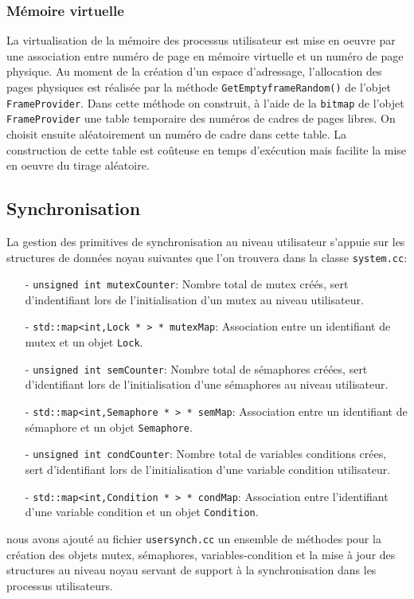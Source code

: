 \documentclass[11pt]{article}
\theoremstyle{definition}
\theoremstyle{definition}
\begin{document}
\subsubsection{Mémoire virtuelle}
La virtualisation de la mémoire des processus utilisateur est mise en oeuvre par une association entre numéro
de page en mémoire virtuelle et un numéro de page physique. Au moment de la création d'un espace d'adressage, l'allocation des pages physiques est réalisée par la méthode \texttt{GetEmptyframeRandom()} de l'objet \texttt{FrameProvider}.
Dans cette méthode on construit, à l'aide de la \texttt{bitmap} de l'objet \texttt{FrameProvider} une table temporaire des numéros de cadres de pages libres.
On choisit ensuite aléatoirement un numéro de cadre dans cette table. La construction de cette table est coûteuse en temps d'exécution mais facilite la mise en oeuvre du tirage aléatoire.

\subsection{Synchronisation}
La gestion des primitives de synchronisation au niveau utilisateur s'appuie sur les structures de données noyau suivantes que l'on trouvera dans la classe \texttt{system.cc}:
\begin{itemize}
\item[-]\texttt{unsigned int mutexCounter}: Nombre total de mutex créés,
  sert d'indentifiant lors de l'initialisation d'un mutex au niveau utilisateur.
\item[-]\texttt{std::map<int,Lock * > * mutexMap}: Association entre un identifiant de mutex
  et un objet \texttt{Lock}.
\item[-]\texttt{unsigned int semCounter}: Nombre total de sémaphores créées,
  sert d'identifiant lors de l'initialisation d'une sémaphores au niveau utilisateur.
\item[-]\texttt{std::map<int,Semaphore * > * semMap}: Association entre un identifiant de sémaphore
  et un objet \texttt{Semaphore}.
\item[-]\texttt{unsigned int condCounter}: Nombre total de variables conditions crées, sert
  d'identifiant lors de l'initialisation d'une variable condition utilisateur.
\item[-]\texttt{std::map<int,Condition * > * condMap}: Association entre l'identifiant d'une variable condition et un objet \texttt{Condition}.
\end{itemize}
nous avons ajouté au fichier \texttt{usersynch.cc} un ensemble de méthodes pour la création des objets mutex, sémaphores, variables-condition et la mise à jour des structures au niveau noyau servant de support à la synchronisation dans les processus utilisateurs.
\end{document}
